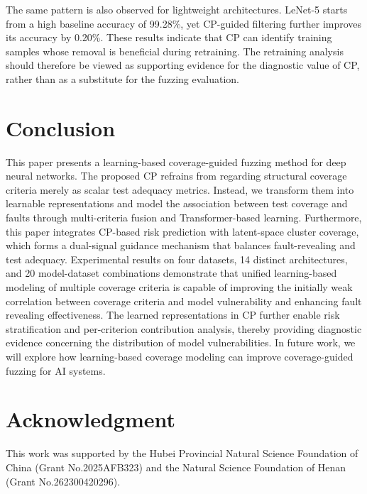\documentclass[preprint,number,5p,twocolumn]{elsarticle}
\begin{document}
The same pattern is also observed for lightweight architectures. LeNet-5 starts from a high baseline accuracy of 99.28\%, yet CP-guided filtering further improves its accuracy by 0.20\%. These results indicate that CP can identify training samples whose removal is beneficial during retraining. The retraining analysis should therefore be viewed as supporting evidence for the diagnostic value of CP, rather than as a substitute for the fuzzing evaluation.


\FloatBarrier
\section{Conclusion}\label{sec:conclusion}

This paper presents a learning-based coverage-guided fuzzing method for deep neural networks. The proposed CP refrains from regarding structural coverage criteria merely as scalar test adequacy metrics. Instead, we transform them into learnable representations and model the association between test coverage and faults through multi-criteria fusion and Transformer-based learning. Furthermore, this paper integrates CP-based risk prediction with latent-space cluster coverage, which forms a dual-signal guidance mechanism that balances fault-revealing and test adequacy. Experimental results on four datasets, 14 distinct architectures, and 20 model-dataset combinations demonstrate that unified learning-based modeling of multiple coverage criteria is capable of improving the initially weak correlation between coverage criteria and model vulnerability and enhancing fault revealing effectiveness. The learned representations in CP further enable risk stratification and per-criterion contribution analysis, thereby providing diagnostic evidence concerning the distribution of model vulnerabilities. In future work, we will explore how learning-based coverage modeling can improve coverage-guided fuzzing for AI systems.

\section*{Acknowledgment}
This work was supported by the Hubei Provincial Natural Science Foundation of China (Grant No.2025AFB323) and the Natural Science Foundation of Henan (Grant No.262300420296).
\end{document}
